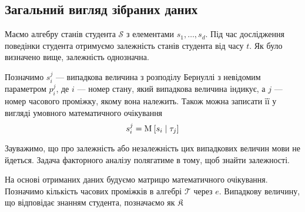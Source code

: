 \subsection{Загальний вигляд зібраних даних}

Маємо алгебру станів студента $\mathcal{S}$ з елементами $s_1, \dots, s_d$.
Під час дослідження поведінки студента отримуємо залежність станів студента
від часу $t$. Як було визначено вище, залежність однозначна.

Позначимо $s_i^j$ --- випадкова величина з розподілу Бернуллі з невідомим
параметром $p_i^j$, де $i$ --- номер стану, який випадкова величина індикує,
а $j$ --- номер часового проміжку, якому вона належить.
Також можна записати її у вигляді умовного математичного очікування
\begin{equation}\label{eq:conditionalExpectation:bernoulli}
  s_i^j = \operatorname{M}_{} \left[ s_i \;\middle|\; \tau_j \right]
\end{equation}

Зауважимо, що про залежність або незалежність цих випадкових величин мови не
йдеться.
Задача факторного аналізу полягатиме в тому, щоб знайти залежності.

На основі отриманих даних будуємо матрицю математичного очікування.
Позначимо кількість часових проміжків в алгебрі $\mathcal{T}$ через $e$.
Випадкову величину, що відповідає знанням студента, позначаємо як $\mathfrak{K}$

